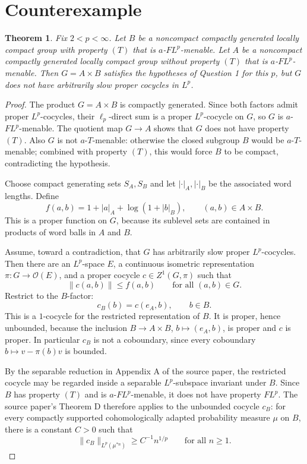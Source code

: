 \documentclass[11pt]{article}
\newtheorem{theorem}{Theorem}
\newcommand{\OO}{\mathcal O}
\begin{document}
\section*{Counterexample}

\begin{theorem}
Fix \(2<p<\infty\). Let \(B\) be a noncompact compactly generated locally
compact group with property \((T)\) that is \(a\)-\(FL^p\)-menable. Let \(A\)
be a noncompact compactly generated locally compact group without property
\((T)\) that is \(a\)-\(FL^p\)-menable. Then \(G=A\times B\) satisfies the
hypotheses of Question 1 for this \(p\), but \(G\) does not have arbitrarily
slow proper cocycles in \(L^p\).
\end{theorem}

\begin{proof}
The product \(G=A\times B\) is compactly generated. Since both factors admit
proper \(L^p\)-cocycles, their \(\ell_p\)-direct sum is a proper
\(L^p\)-cocycle on \(G\), so \(G\) is \(a\)-\(FL^p\)-menable. The quotient
map \(G\to A\) shows that \(G\) does not have property \((T)\). Also \(G\) is
not \(a\)-\(T\)-menable: otherwise the closed subgroup \(B\) would be
\(a\)-\(T\)-menable; combined with property \((T)\), this would force \(B\)
to be compact, contradicting the hypothesis.

Choose compact generating sets \(S_A,S_B\) and let \(|\cdot|_A,|\cdot|_B\)
be the associated word lengths. Define
\[
  f(a,b)=1+|a|_A+\log(1+|b|_B),\qquad (a,b)\in A\times B .
\]
This is a proper function on \(G\), because its sublevel sets are contained in
products of word balls in \(A\) and \(B\).

Assume, toward a contradiction, that \(G\) has arbitrarily slow proper
\(L^p\)-cocycles. Then there are an \(L^p\)-space \(E\), a continuous
isometric representation \(\pi:G\to \OO(E)\), and a proper cocycle
\(c\in Z^1(G,\pi)\) such that
\[
  \|c(a,b)\|\leq f(a,b)\qquad\text{for all }(a,b)\in G .
\]
Restrict to the \(B\)-factor:
\[
  c_B(b)=c(e_A,b),\qquad b\in B .
\]
This is a \(1\)-cocycle for the restricted representation of \(B\). It is
proper, hence unbounded, because the inclusion \(B\to A\times B\),
\(b\mapsto(e_A,b)\), is proper and \(c\) is proper.
In particular \(c_B\) is not a coboundary, since every coboundary
\(b\mapsto v-\pi(b)v\) is bounded.

By the separable reduction in Appendix A of the source paper, the restricted
cocycle may be regarded inside a separable \(L^p\)-subspace invariant under
\(B\). Since \(B\) has property \((T)\) and is \(a\)-\(FL^p\)-menable, it
does not have property \(FL^p\). The source paper's Theorem D therefore
applies to the unbounded cocycle \(c_B\): for every compactly supported
cohomologically adapted probability measure \(\mu\) on \(B\), there is a
constant \(C>0\) such that
\[
  \|c_B\|_{L^p(\mu^{*n})}\geq C^{-1}n^{1/p}
  \qquad\text{for all }n\geq 1 .
\]


\end{proof}
\end{document}
